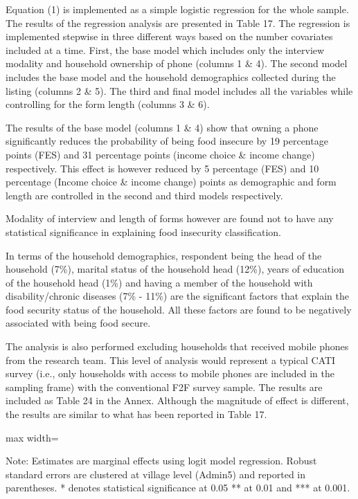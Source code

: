 \documentclass[11pt,harvard]{article}
\begin{document}
Equation (1) is implemented as a simple logistic regression for the whole sample. The results of the regression analysis are presented in Table 17. The regression is implemented stepwise in three different ways based on the number covariates included at a time. First, the base model which includes only the interview modality and household ownership of phone (columns 1 \& 4). The second model includes the base model and the household demographics collected during the listing (columns 2 \& 5). The third and final model includes all the variables while controlling for the form length (columns 3 \& 6).

The results of the base model (columns 1 \& 4) show that owning a phone significantly reduces the probability of being food insecure by 19 percentage points (FES) and 31 percentage points (income choice \& income change) respectively. This effect is however reduced by 5 percentage (FES) and 10 percentage (Income choice \& income change) points as demographic and form length are controlled in the second and third models respectively. 

Modality of interview and length of forms however are found not to have any statistical significance in explaining food insecurity classification.

In terms of the household demographics, respondent being the head of the household (7\%), marital status of the household head (12\%), years of education of the household head (1\%) and having a member of the household with disability/chronic diseases (7\% - 11\%) are the significant factors that explain the food security status of the household. All these factors are found to be negatively associated with being food secure.

The analysis is also performed excluding households that received mobile phones from the research team. This level of analysis would represent a typical CATI survey (i.e., only households with access to mobile phones are included in the sampling frame) with the conventional F2F survey sample. The results are included as Table 24 in the Annex. Although the magnitude of effect is different, the results are similar to what has been reported in Table 17.

\begin{table}[htbp]
	\centering
	\begin{adjustbox}{max width=\textwidth}
		\begin{threeparttable}
			\caption{Logit Regression on Food Security based Outcomes}
			\scriptsize
			 
			\label{tab:CAR_FS_Logit}
			\begin{tablenotes}
				\item Note: Estimates are marginal effects using logit model regression. Robust standard errors are clustered at village level (Admin5) and reported in parentheses. * denotes statistical significance at 0.05 ** at 0.01 and *** at 0.001.
			\end{tablenotes}
		\end{threeparttable}
	\end{adjustbox}
\end{table}
\end{document}
